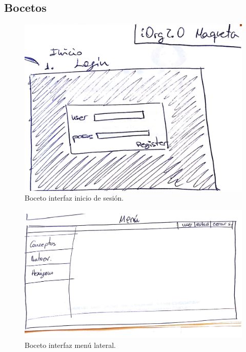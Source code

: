 \newpage

\subsection{Bocetos}

\begin{figure}[!ht]
  \begin{center}
    \includegraphics[width=1\textwidth]{../images/boceto_login.png}
    \caption{Boceto interfaz inicio de sesión.}
    \label{fig:boceto_login}
  \end{center}
\end{figure}


\begin{figure}[!ht]
  \begin{center}
    \includegraphics[width=1\textwidth]{../images/boceto_menu_lat.png}
    \caption{Boceto interfaz menú lateral.}
    \label{fig:boceto_menu_lat}
  \end{center}
\end{figure}



